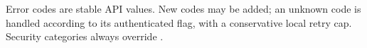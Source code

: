 Error codes are stable API values. New codes may be added; an unknown code is
handled according to its authenticated  flag, with a conservative
local retry cap. Security categories always override .

